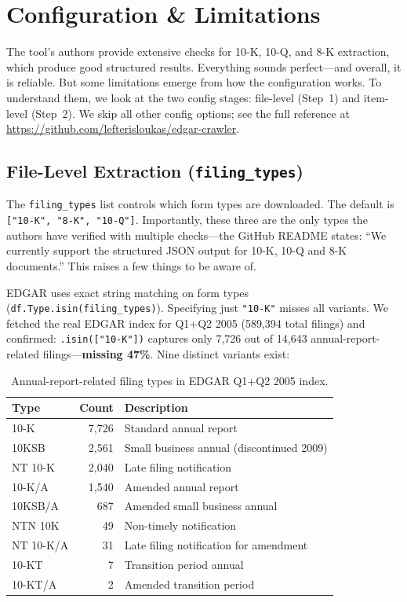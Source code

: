 \documentclass[11pt]{article}
\begin{document}
\section{Configuration \& Limitations}

The tool's authors provide extensive checks for 10-K, 10-Q, and 8-K extraction,
which produce good structured results. Everything sounds perfect---and overall,
it is reliable. But some limitations emerge from how the configuration works. To
understand them, we look at the two config stages: file-level (Step~1) and
item-level (Step~2). We skip all other config options; see the full reference at
\url{https://github.com/lefterisloukas/edgar-crawler}.

\subsection{File-Level Extraction (\texttt{filing\_types})}

The \texttt{filing\_types} list controls which form types are downloaded. The
default is \texttt{["10-K", "8-K", "10-Q"]}. Importantly, these three are the
only types the authors have verified with multiple checks---the GitHub README
states: ``We currently support the structured JSON output for 10-K, 10-Q and 8-K
documents.'' This raises a few things to be aware of.

EDGAR uses exact string matching on form types
(\texttt{df.Type.isin(filing\_types)}). Specifying just \texttt{"10-K"} misses
all variants. We fetched the real EDGAR index for Q1+Q2 2005 (589,394 total
filings) and confirmed: \texttt{.isin(["10-K"])} captures only 7,726 out of
14,643 annual-report-related filings---\textbf{missing 47\%}. Nine distinct
variants exist:

\begin{table}[h]
\centering
\begin{tabular}{lrl}
\toprule
Type & Count & Description \\
\midrule
10-K     & 7,726 & Standard annual report \\
10KSB    & 2,561 & Small business annual (discontinued 2009) \\
NT 10-K  & 2,040 & Late filing notification \\
10-K/A   & 1,540 & Amended annual report \\
10KSB/A  & 687   & Amended small business annual \\
NTN 10K  & 49    & Non-timely notification \\
NT 10-K/A & 31   & Late filing notification for amendment \\
10-KT    & 7     & Transition period annual \\
10-KT/A  & 2     & Amended transition period \\
\bottomrule
\end{tabular}
\caption{Annual-report-related filing types in EDGAR Q1+Q2 2005 index.}
\end{table}
\end{document}
